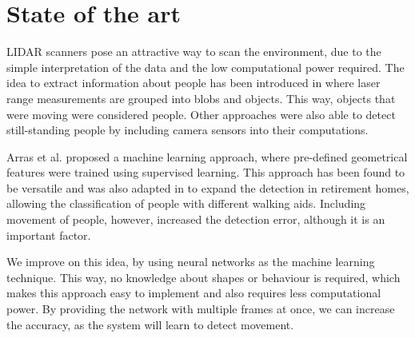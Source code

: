 \section{State of the art}

LIDAR scanners pose an attractive way to scan the environment, due to the simple interpretation of the data and the low computational power required. The idea to extract information about people has been introduced in \cite{1013691} where laser range measurements  are grouped into blobs and objects. This way, objects that were moving were considered people. Other approaches were also able to detect still-standing people by including camera sensors \cite{1013691} \cite{aguirre2014leg} into their computations.

Arras et al. proposed a machine learning approach, where pre-defined geometrical features were trained using supervised learning. This approach has been found to be versatile and was also adapted in \cite{weinrich2014people} to expand the detection in retirement homes, allowing the classification of people with different walking aids. Including movement of people, however, increased the detection error, although it is an important factor.

We improve on this idea, by using neural networks as the machine learning technique. This way, no knowledge about shapes or behaviour is required, which makes this approach easy to implement and also requires less computational power. By providing the network with multiple frames at once, we can increase the accuracy, as the system will learn to detect movement.